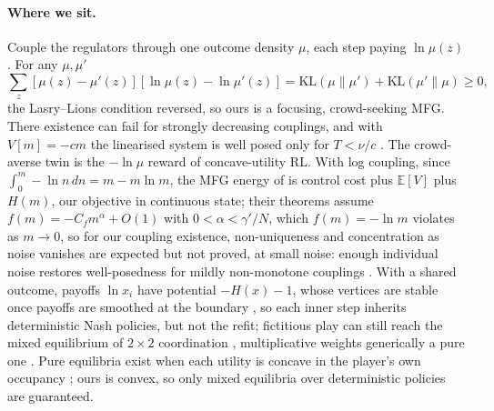 \documentclass[10pt]{article}
\begin{document}
\paragraph{Where we sit.}
Couple the regulators through one outcome density $\mu$, each step paying $\ln\mu(z)$. For any $\mu,\mu'$
\[
\textstyle\sum_z [\mu(z)-\mu'(z)][\ln\mu(z)-\ln\mu'(z)] = \mathrm{KL}(\mu\|\mu')+\mathrm{KL}(\mu'\|\mu)\ge 0,
\]
the Lasry--Lions condition reversed, so ours is a focusing, crowd-seeking MFG. There existence can fail for strongly decreasing couplings, and with $V[m]=-cm$ the linearised system is well posed only for $T<\nu/c$ \citep{Lasry-mean07}. The crowd-averse twin is the $-\ln\mu$ reward of concave-utility RL. With log coupling, since $\int_0^m -\ln n\,dn = m-m\ln m$, the MFG energy of \citet{Cesaroni-concentration19} is control cost plus $\mathbb{E}[V]$ plus $H(m)$, our objective in continuous state; their theorems assume $f(m)=-C_f m^\alpha+O(1)$ with $0<\alpha<\gamma'/N$, which $f(m)=-\ln m$ violates as $m\to0$, so for our coupling existence, non-uniqueness and concentration as noise vanishes are expected but not proved, at small noise: enough individual noise restores well-posedness for mildly non-monotone couplings \citep{Cirant-long21}. With a shared outcome, payoffs $\ln x_i$ have potential $-H(x)-1$, whose vertices are stable once payoffs are smoothed at the boundary \citep[Thm.~4.4]{Sandholm-potential01}, so each inner step inherits deterministic Nash policies, but not the refit; fictitious play can still reach the mixed equilibrium of $2\times2$ coordination \citep{MondererShapley-fictitious96}, multiplicative weights generically a pure one \citep{Kleinberg-multiplicative09}. Pure equilibria exist when each utility is concave in the player's own occupancy \citep{Gemp-convex24}; ours is convex, so only mixed equilibria over deterministic policies are guaranteed.
\end{document}
